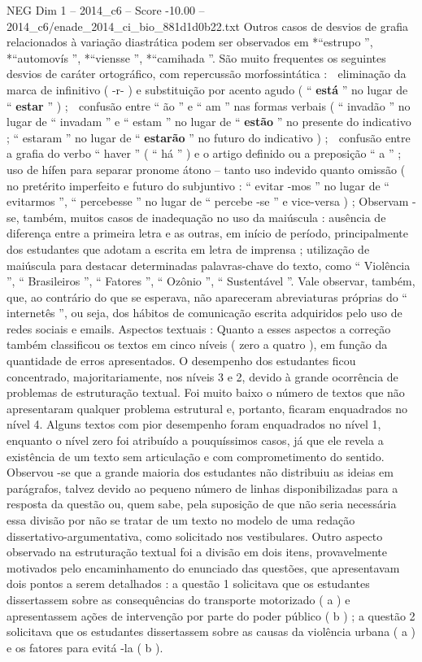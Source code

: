 \begin{textsample}{NEG Dim 1 – 2014\_c6 – Score -10.00 – 2014\_c6/enade\_2014\_ci\_bio\_881d1d0b22.txt}
Outros casos de desvios de grafia relacionados à variação diastrática podem ser observados em *“estrupo ”, *“automovís ”, *“viensse ”, *“camihada ”.
São muito frequentes os seguintes desvios de caráter ortográfico, com repercussão morfossintática :  eliminação da marca de infinitivo ( -r- ) e substituição por acento agudo ( “ \textbf{está} ” no lugar de “ \textbf{estar} ” ) ;  confusão entre “ ão ” e “ am ” nas formas verbais ( “ invadão ” no lugar de “ invadam ” e “ estam ” no lugar de “ \textbf{estão} ” no presente do indicativo ; “ estaram ” no lugar de “ \textbf{estarão} ” no futuro do indicativo ) ;  confusão entre a grafia do verbo “ haver ” ( “ há ” ) e o artigo definido ou a preposição “ a ” ;  uso de hífen para separar pronome átono – tanto uso indevido quanto omissão ( no pretérito imperfeito e futuro do subjuntivo : “ evitar -mos ” no lugar de “ evitarmos ”, “ percebesse ” no lugar de “ percebe -se ” e vice-versa ) ; Observam -se, também, muitos casos de inadequação no uso da maiúscula : ausência de diferença entre a primeira letra e as outras, em início de período, principalmente dos estudantes que adotam a escrita em letra de imprensa ; utilização de maiúscula para destacar determinadas palavras-chave do texto, como “ Violência ”, “ Brasileiros ”, “ Fatores ”, “ Ozônio ”, “ Sustentável ”.
Vale observar, também, que, ao contrário do que se esperava, não apareceram abreviaturas próprias do “ internetês ”, ou seja, dos hábitos de comunicação escrita adquiridos pelo uso de redes sociais e emails.
Aspectos textuais : Quanto a esses aspectos a correção também classificou os textos em cinco níveis ( zero a quatro ), em função da quantidade de erros apresentados.
O desempenho dos estudantes ficou concentrado, majoritariamente, nos níveis 3 e 2, devido à grande ocorrência de problemas de estruturação textual.
Foi muito baixo o número de textos que não apresentaram qualquer problema estrutural e, portanto, ficaram enquadrados no nível 4.
Alguns textos com pior desempenho foram enquadrados no nível 1, enquanto o nível zero foi atribuído a pouquíssimos casos, já que ele revela a existência de um texto sem articulação e com comprometimento do sentido.
Observou -se que a grande maioria dos estudantes não distribuiu as ideias em parágrafos, talvez devido ao pequeno número de linhas disponibilizadas para a resposta da questão ou, quem sabe, pela suposição de que não seria necessária essa divisão por não se tratar de um texto no modelo de uma redação dissertativo-argumentativa, como solicitado nos vestibulares.
Outro aspecto observado na estruturação textual foi a divisão em dois itens, provavelmente motivados pelo encaminhamento do enunciado das questões, que apresentavam dois pontos a serem detalhados : a questão 1 solicitava que os estudantes dissertassem sobre as consequências do transporte motorizado ( a ) e apresentassem ações de intervenção por parte do poder público ( b ) ; a questão 2 solicitava que os estudantes dissertassem sobre as causas da violência urbana ( a ) e os fatores para evitá -la ( b ).

\end{textsample}
